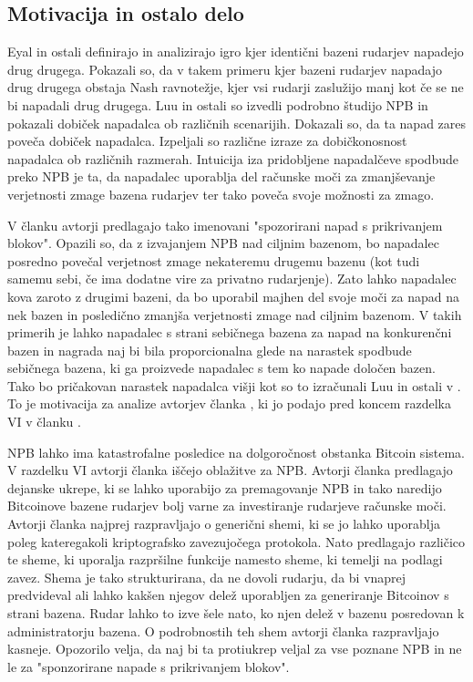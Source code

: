 \documentclass[12pt]{article}
\begin{document}
\subsection{Motivacija in ostalo delo}

Eyal \cite{minnersdilemma} in ostali definirajo in analizirajo igro kjer identični bazeni rudarjev napadejo drug drugega. Pokazali so, da v takem primeru kjer bazeni rudarjev napadajo drug drugega obstaja Nash ravnotežje, kjer vsi rudarji zaslužijo manj kot če se ne bi napadali drug drugega. Luu in ostali \cite{powersplitting} so izvedli podrobno študijo NPB in pokazali dobiček napadalca ob različnih scenarijih. Dokazali so, da ta napad zares poveča dobiček napadalca. Izpeljali so različne izraze za dobičkonosnost napadalca ob različnih razmerah. Intuicija iza pridobljene napadalčeve spodbude preko NPB je ta, da napadalec uporablja del računske moči za zmanjševanje verjetnosti zmage bazena rudarjev ter tako poveča svoje možnosti za zmago.

V članku \cite{originalarticle} avtorji predlagajo tako imenovani "spozorirani napad s prikrivanjem blokov". Opazili so, da z izvajanjem NPB nad ciljnim bazenom, bo napadalec posredno povečal verjetnost zmage nekateremu drugemu bazenu (kot tudi samemu sebi, če ima dodatne vire za privatno rudarjenje). Zato lahko napadalec kova zaroto z drugimi bazeni, da bo uporabil majhen del svoje moči za napad na nek bazen in posledično zmanjša verjetnosti zmage nad ciljnim bazenom. V takih primerih je lahko napadalec s strani sebičnega bazena za napad na konkurenčni bazen in nagrada naj bi bila proporcionalna glede na narastek spodbude sebičnega bazena, ki ga proizvede napadalec s tem ko napade določen bazen. Tako bo pričakovan narastek napadalca višji kot so to izračunali Luu in ostali v \cite{powersplitting}. To je motivacija za analize avtorjev članka \cite{originalarticle}, ki jo podajo pred koncem razdelka VI v članku \cite{originalarticle}.


NPB lahko ima katastrofalne posledice na dolgoročnost obstanka Bitcoin sistema. V razdelku VI avtorji članka \cite{originalarticle} iščejo oblažitve za NPB. Avtorji članka \cite{originalarticle} predlagajo dejanske ukrepe, ki se lahko uporabijo za premagovanje NPB in tako naredijo Bitcoinove bazene rudarjev bolj varne za investiranje rudarjeve računske moči. Avtorji članka \cite{originalarticle} najprej razpravljajo o generični shemi, ki se jo lahko uporablja poleg kateregakoli kriptografsko zavezujočega protokola. Nato predlagajo različico te sheme, ki uporalja razpršilne funkcije namesto sheme, ki temelji na podlagi zavez. Shema je tako strukturirana, da ne dovoli rudarju, da bi vnaprej predvideval ali lahko kakšen njegov delež uporabljen za generiranje Bitcoinov s strani bazena. Rudar lahko to izve šele nato, ko njen delež v bazenu posredovan k administratorju bazena. O podrobnostih teh shem avtorji članka \cite{originalarticle} razpravljajo kasneje. Opozorilo velja, da naj bi ta protiukrep veljal za vse poznane NPB in ne le za "sponzorirane napade s prikrivanjem blokov".
\end{document}
